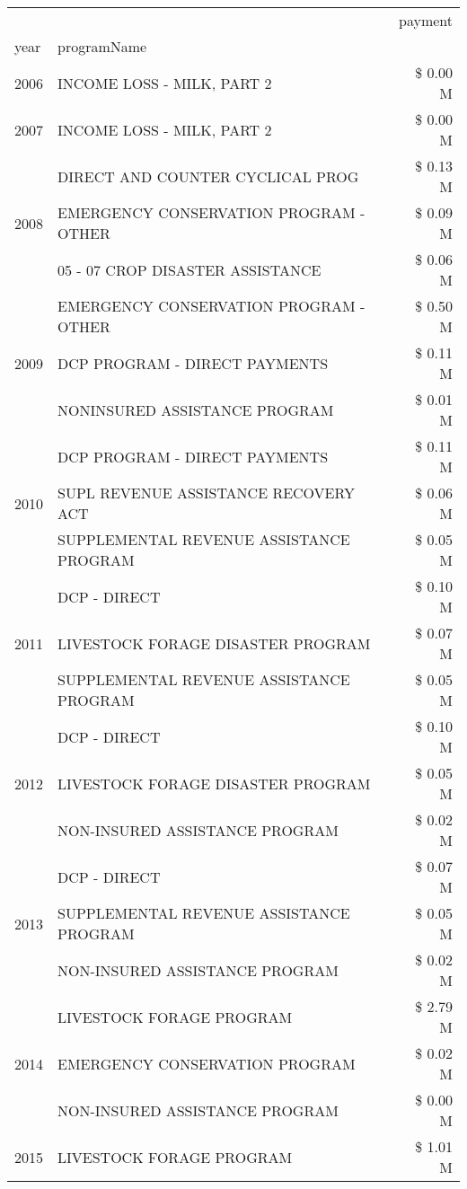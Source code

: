 \begin{tabular}{llr}
\toprule
 &  & payment \\
year & programName &  \\
\midrule
2006 & INCOME LOSS - MILK, PART 2 & \$ 0.00 M \\
\cline{1-3}
2007 & INCOME LOSS - MILK, PART 2 & \$ 0.00 M \\
\cline{1-3}
\multirow[t]{3}{*}{2008} & DIRECT AND COUNTER CYCLICAL PROG & \$ 0.13 M \\
 & EMERGENCY CONSERVATION PROGRAM - OTHER & \$ 0.09 M \\
 & 05 - 07 CROP DISASTER ASSISTANCE & \$ 0.06 M \\
\cline{1-3}
\multirow[t]{3}{*}{2009} & EMERGENCY CONSERVATION PROGRAM - OTHER & \$ 0.50 M \\
 & DCP PROGRAM - DIRECT PAYMENTS & \$ 0.11 M \\
 & NONINSURED ASSISTANCE PROGRAM & \$ 0.01 M \\
\cline{1-3}
\multirow[t]{3}{*}{2010} & DCP PROGRAM - DIRECT PAYMENTS & \$ 0.11 M \\
 & SUPL REVENUE ASSISTANCE RECOVERY ACT & \$ 0.06 M \\
 & SUPPLEMENTAL REVENUE ASSISTANCE PROGRAM & \$ 0.05 M \\
\cline{1-3}
\multirow[t]{3}{*}{2011} & DCP - DIRECT & \$ 0.10 M \\
 & LIVESTOCK FORAGE DISASTER PROGRAM & \$ 0.07 M \\
 & SUPPLEMENTAL REVENUE ASSISTANCE PROGRAM & \$ 0.05 M \\
\cline{1-3}
\multirow[t]{3}{*}{2012} & DCP - DIRECT & \$ 0.10 M \\
 & LIVESTOCK FORAGE DISASTER PROGRAM & \$ 0.05 M \\
 & NON-INSURED ASSISTANCE PROGRAM & \$ 0.02 M \\
\cline{1-3}
\multirow[t]{3}{*}{2013} & DCP - DIRECT & \$ 0.07 M \\
 & SUPPLEMENTAL REVENUE ASSISTANCE PROGRAM & \$ 0.05 M \\
 & NON-INSURED ASSISTANCE PROGRAM & \$ 0.02 M \\
\cline{1-3}
\multirow[t]{3}{*}{2014} & LIVESTOCK FORAGE PROGRAM & \$ 2.79 M \\
 & EMERGENCY CONSERVATION PROGRAM & \$ 0.02 M \\
 & NON-INSURED ASSISTANCE PROGRAM & \$ 0.00 M \\
\cline{1-3}
\multirow[t]{3}{*}{2015} & LIVESTOCK FORAGE PROGRAM & \$ 1.01 M \\

\end{tabular}
